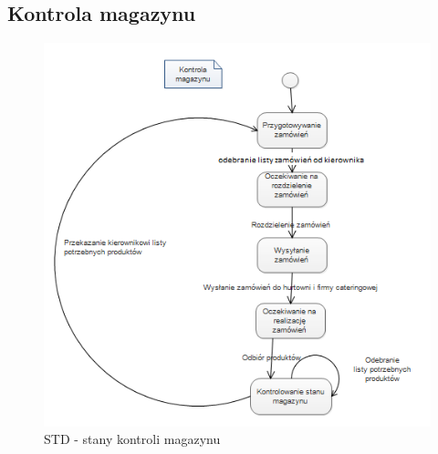 \documentclass[a4paper, 11pt]{article}
\begin{document}
		\subsection{Kontrola magazynu}
		\indent
	\begin{figure}[H]%
		\includegraphics[scale=1.0]{Img/STD-kierownik3.png}
		\caption{STD - stany kontroli magazynu}
	\end{figure}
\end{document}

